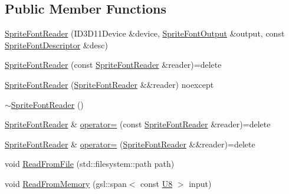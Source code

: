 \subsection*{Public Member Functions}
\begin{DoxyCompactItemize}
\item 
\mbox{\hyperlink{classmage_1_1rendering_1_1loader_1_1_sprite_font_reader_a5cef04ca33ef0047664fa757de6e1b8f}{Sprite\+Font\+Reader}} (I\+D3\+D11\+Device \&device, \mbox{\hyperlink{structmage_1_1rendering_1_1_sprite_font_output}{Sprite\+Font\+Output}} \&output, const \mbox{\hyperlink{classmage_1_1rendering_1_1_sprite_font_descriptor}{Sprite\+Font\+Descriptor}} \&desc)
\item 
\mbox{\hyperlink{classmage_1_1rendering_1_1loader_1_1_sprite_font_reader_a4c96a8d3554084baaf4b24f94a582ac6}{Sprite\+Font\+Reader}} (const \mbox{\hyperlink{classmage_1_1rendering_1_1loader_1_1_sprite_font_reader}{Sprite\+Font\+Reader}} \&reader)=delete
\item 
\mbox{\hyperlink{classmage_1_1rendering_1_1loader_1_1_sprite_font_reader_a71239906b4c7609747d5fe47189883b6}{Sprite\+Font\+Reader}} (\mbox{\hyperlink{classmage_1_1rendering_1_1loader_1_1_sprite_font_reader}{Sprite\+Font\+Reader}} \&\&reader) noexcept
\item 
\mbox{\hyperlink{classmage_1_1rendering_1_1loader_1_1_sprite_font_reader_a206d696476cd2ed6606932c549cd0c6c}{$\sim$\+Sprite\+Font\+Reader}} ()
\item 
\mbox{\hyperlink{classmage_1_1rendering_1_1loader_1_1_sprite_font_reader}{Sprite\+Font\+Reader}} \& \mbox{\hyperlink{classmage_1_1rendering_1_1loader_1_1_sprite_font_reader_a645988b6bba2a4fda93d18c4c9e3d09c}{operator=}} (const \mbox{\hyperlink{classmage_1_1rendering_1_1loader_1_1_sprite_font_reader}{Sprite\+Font\+Reader}} \&reader)=delete
\item 
\mbox{\hyperlink{classmage_1_1rendering_1_1loader_1_1_sprite_font_reader}{Sprite\+Font\+Reader}} \& \mbox{\hyperlink{classmage_1_1rendering_1_1loader_1_1_sprite_font_reader_ac6902b3475ae8425d475de59135a11a3}{operator=}} (\mbox{\hyperlink{classmage_1_1rendering_1_1loader_1_1_sprite_font_reader}{Sprite\+Font\+Reader}} \&\&reader)=delete
\item 
void \mbox{\hyperlink{classmage_1_1rendering_1_1loader_1_1_sprite_font_reader_a0308b90e3cf888d383a228cfe8827972}{Read\+From\+File}} (std\+::filesystem\+::path path)
\item 
void \mbox{\hyperlink{classmage_1_1rendering_1_1loader_1_1_sprite_font_reader_afc48490dca5042078726a1ec3fe7abe7}{Read\+From\+Memory}} (gsl\+::span$<$ const \mbox{\hyperlink{namespacemage_afc638980bc6154f15af5e2d93a0e0ea9}{U8}} $>$ input)
\end{DoxyCompactItemize}

